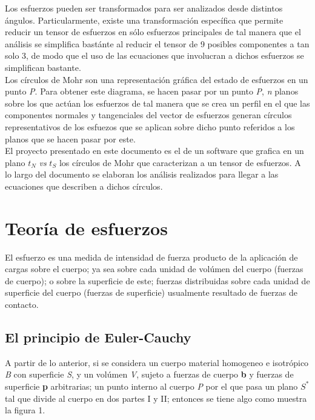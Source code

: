 \documentclass{article}
\begin{document}
    Los esfuerzos pueden ser transformados para ser analizados desde distintos ángulos.
    Particularmente, existe una transformaci\'{o}n específica que permite reducir un tensor de
    esfuerzos en sólo esfuerzos principales de tal manera que el análisis se
    simplifica bastánte al reducir el tensor de 9 posibles componentes a tan solo 3, de
    modo que el uso de las ecuaciones que involucran a dichos esfuerzos se
    simplifican bastante.\\
    
    Los círculos de Mohr son una representación gráfica del estado de esfuerzos en un punto 
    \textit{P}. Para obtener este diagrama, se hacen pasar por un punto \textit{P}, 
    \textit{n} planos \bm{$\eta$} sobre los que actúan los esfuerzos de tal manera que se 
    crea un perfil en el que las componentes normales y tangenciales del vector de esfuerzos 
     generan círculos representativos de los esfuezos que se aplican sobre 
    dicho punto referidos a los planos \bm{$\eta$} que se hacen pasar por este.\\

    El proyecto presentado en este documento es el de un software que grafica en un plano
    ${t}_{N}$ \textit{vs} ${t}_{S}$ los círculos de Mohr que caracterizan a un tensor 
    de esfuerzos. A lo largo del documento se elaboran los análisis realizados para llegar 
    a las ecuaciones que describen a dichos círculos.

    \section{Teor\'{i}a de esfuerzos}

    El esfuerzo es una medida de intensidad de fuerza producto de la aplicación de cargas
    sobre el cuerpo; ya sea sobre cada unidad de volúmen del cuerpo (fuerzas de cuerpo);
    o sobre la superficie de este; fuerzas distribuidas sobre cada unidad de superficie
    del cuerpo (fuerzas de superficie) usualmente resultado de fuerzas de contacto.

    \subsection{El principio de Euler-Cauchy}

    A partir de lo anterior, si se considera un cuerpo material homogeneo e isotrópico
    \textit{B} con superficie \textit{S}, y un volúmen \textit{V}, sujeto a fuerzas de
    cuerpo \textbf{b} y fuerzas de superficie \textbf{p} arbitrarias; un punto interno 
    al cuerpo \textit{P} por el que pasa un plano $S^{*}$ tal que divide al cuerpo
    en dos partes I y II; entonces se tiene algo como muestra la figura 1.
\end{document}
